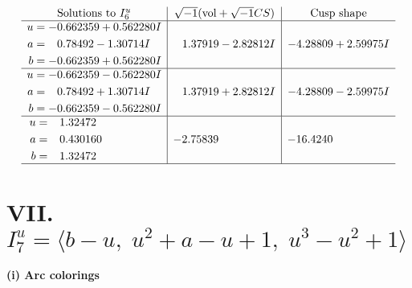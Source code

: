\documentclass[1p]{elsarticle_modified}
\theoremstyle{definition}
\newcommand{\I}{\sqrt{-1}}
\begin{document}
$$\begin{array}{c|c|c}  
\text{Solutions to }I^u_{6}& \I (\text{vol} + \sqrt{-1}CS) & \text{Cusp shape}\\
 \hline 
\begin{aligned}
u &= -0.662359 + 0.562280 I \\
a &= \phantom{-}0.78492 - 1.30714 I \\
b &= -0.662359 + 0.562280 I\end{aligned}
 & \phantom{-}1.37919 - 2.82812 I & -4.28809 + 2.59975 I \\ \hline\begin{aligned}
u &= -0.662359 - 0.562280 I \\
a &= \phantom{-}0.78492 + 1.30714 I \\
b &= -0.662359 - 0.562280 I\end{aligned}
 & \phantom{-}1.37919 + 2.82812 I & -4.28809 - 2.59975 I \\ \hline\begin{aligned}
u &= \phantom{-}1.32472\phantom{ +0.000000I} \\
a &= \phantom{-}0.430160\phantom{ +0.000000I} \\
b &= \phantom{-}1.32472\phantom{ +0.000000I}\end{aligned}
 & -2.75839\phantom{ +0.000000I} & -16.4240\phantom{ +0.000000I}\\
 \hline 
 \end{array}$$\newpage\newpage\renewcommand{\arraystretch}{1}
\centering \section*{VII. $I^u_{7}= \langle b- u,\;u^2+a- u+1,\;u^3- u^2+1 \rangle$}
\flushleft \textbf{(i) Arc colorings}\\
\end{document}

